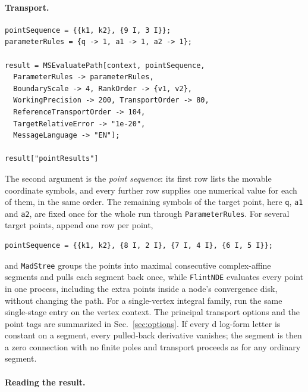 \documentclass[11pt,a4paper]{article}
\begin{document}
\paragraph{Transport.}

\begin{verbatim}
pointSequence = {{k1, k2}, {9 I, 3 I}};
parameterRules = {q -> 1, a1 -> 1, a2 -> 1};

result = MSEvaluatePath[context, pointSequence,
  ParameterRules -> parameterRules,
  BoundaryScale -> 4, RankOrder -> {v1, v2},
  WorkingPrecision -> 200, TransportOrder -> 80,
  ReferenceTransportOrder -> 104,
  TargetRelativeError -> "1e-20",
  MessageLanguage -> "EN"];

result["pointResults"]
\end{verbatim}
The second argument is the \emph{point sequence}: its first row lists the movable coordinate
symbols, and every further row supplies one numerical value for each of them, in the same order.
The remaining symbols of the target point, here \texttt{q}, \texttt{a1} and \texttt{a2}, are fixed
once for the whole run through \texttt{ParameterRules}. For several target points, append one row per
point,
\begin{verbatim}
pointSequence = {{k1, k2}, {8 I, 2 I}, {7 I, 4 I}, {6 I, 5 I}};
\end{verbatim}
and \texttt{MadStree} groups the
points into maximal consecutive complex-affine segments and pulls each segment back once, while
\texttt{FlintNDE} evaluates every point in one process, including the extra points inside a node's
convergence disk, without changing the path. For a single-vertex integral family, run the same
single-stage entry on the vertex context. The principal transport options and the point tags are
summarized in Sec.~\ref{sec:options}. If every d log-form letter is constant on a segment, every
pulled-back derivative vanishes; the segment is then a zero connection with no finite poles and
transport proceeds as for any ordinary segment.

\paragraph{Reading the result.}
\end{document}
